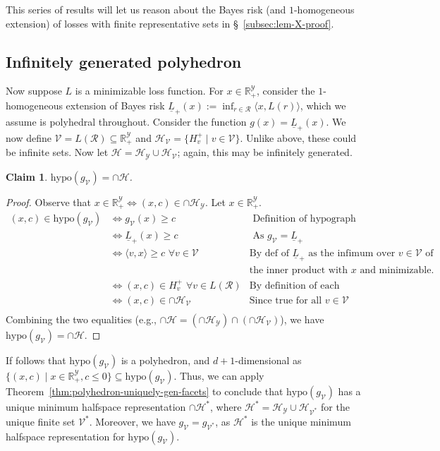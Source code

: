 \documentclass[11pt]{article}
\newcommand{\Comments}{1}
\newcommand{\mynote}[2]{\ifnum\Comments=1\textcolor{#1}{#2}\fi}
\newcommand{\raf}[1]{\mynote{darkgreen}{[RF: #1]}}
\newcommand{\reals}{\mathbb{R}}
\renewcommand{\H}{\mathcal{H}}
\newcommand{\R}{\mathcal{R}}
\newcommand{\V}{\mathcal{V}}
\newcommand{\Y}{\mathcal{Y}}
\newcommand{\risk}[1]{\underline{#1}}
\newcommand{\inprod}[2]{\langle #1, #2 \rangle}%
\newcommand{\hyp}{\mathrm{hypo}}
\newtheorem{claim}{Claim}
\begin{document}
This series of results will let us reason about the Bayes risk (and $1$-homogeneous extension) of losses with finite representative sets in \S~\ref{subsec:lem-X-proof}.

\subsection{Infinitely generated polyhedron}\label{appsubsec:phase2}

Now suppose $L$ is a minimizable loss function.
For $x\in\reals^\Y_+$, consider the $1$-homogeneous extension of Bayes risk  $\risk{L}_+(x) := \inf_{r\in\R} \inprod{x}{L(r)}$, which we assume is polyhedral throughout.
Consider the function $g(x) = \risk{L}_+(x)$.
We now define $\V = L(\R) \subseteq \reals^\Y_+$ and $\H_{\V} = \{H_v^+ \mid v\in\V\}$.  
Unlike above, these could be infinite sets.  
Now let $\H = \H_\Y \cup \H_{\V}$; again, this may be infinitely generated.
\begin{claim}
	$\hyp(g_\V) = \cap\H$.
\end{claim}
\begin{proof}
	Observe that $x \in \reals^\Y_+ \iff (x, c) \in \cap \H_\Y$.
	Let $x \in \reals^\Y_+$.
	\begin{align*}
	(x,c) \in \hyp(g_\V)
	&\iff g_\V(x) \geq c & \text{ Definition of hypograph}\\
	&\iff \risk L_+(x) \geq c & \text{ As $g_\V=\risk L_+$}\\
	&\iff \inprod{v}{x} \geq c \,\, \forall v \in \V & \text{By def of $\risk L_+$ as the infimum over $v \in \V$ of}\\
	& & \text{the inner product with $x$ and minimizable.} \\
	&\iff (x,c) \in H^+_{v} \,\, \forall v \in L(\R) & \text{By definition of each halfspace}\\
	&\iff (x,c) \in \cap \H_\V & \text{Since true for all $v \in \V$} \\ 
	\end{align*}
	Combining the two equalities (e.g., $\cap \H = (\cap \H_\Y) \cap (\cap \H_\V)$), we have $\hyp(g_\V) = \cap \H$.
	
\end{proof}

If follows that $\hyp(g_\V)$ is a polyhedron, and $d+1$-dimensional as $\{(x,c) \mid x \in \reals^\Y_+, c \leq 0\} \subseteq \hyp(g_\V)$.
Thus, we can apply Theorem~\ref{thm:polyhedron-uniquely-gen-facets} to conclude that $\hyp(g_\V)$ has a unique minimum halfspace representation $\cap \H^*$, where $\H^* = \H_\Y \cup \H_{\V^*}$ for the unique finite set $\V^*$.
Moreover, we have $g_\V = g_{\V^*}$, as $\H^*$ is the unique minimum halfspace representation for $\hyp(g_\V)$.
\end{document}

